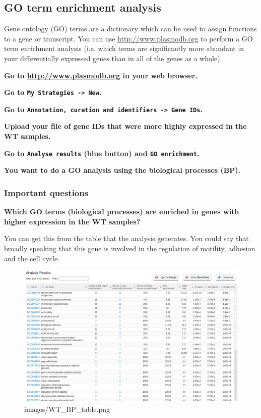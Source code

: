 \documentclass[11pt]{article}
\makeatletter
\def\maxwidth{\ifdim\Gin@nat@width>\linewidth\linewidth
    \else\Gin@nat@width\fi}
\let\Oldincludegraphics\includegraphics
\renewcommand{\includegraphics}[1]{\Oldincludegraphics[width=.8\maxwidth, height=.55\textheight, keepaspectratio]{#1}}
\makeatother
\begin{document}
    \subsection{GO term enrichment
analysis}\label{go-term-enrichment-analysis}

Gene ontology (GO) terms are a dictionary which can be used to assign
functions to a gene or transcript. You can use
\url{http://www.plasmodb.org} to perform a GO term enrichment analysis
(i.e. which terms are significantly more abundant in your differentially
expressed genes than in all of the genes as a whole).

\textbf{Go to \url{http://www.plasmodb.org} in your web browser.}

\textbf{Go to \texttt{My\ Strategies\ -\textgreater{}\ New}.}

\textbf{Go to
\texttt{Annotation,\ curation\ and\ identifiers\ -\textgreater{}\ Gene\ IDs}.}

\textbf{Upload your file of gene IDs that were more highly expressed in
the WT samples.}

\textbf{Go to \texttt{Analyse\ results} (blue button) and
\texttt{GO\ enrichment}.}

\textbf{You want to do a GO analysis using the biological processes (BP).}

\subsubsection{Important questions}\label{important-questions}

\textbf{Which GO terms (biological processes) are enriched in genes with
higher expression in the WT samples?}

You can get this from the table that the analysis generates. You could
say that broadly speaking that this gene is involved in the regulation
of motility, adhesion and the cell cycle.

    \begin{figure}[!h]
\centering
\includegraphics{images/WT_BP_table.png}
\caption{images/WT\_BP\_table.png}
\end{figure}
\end{document}
